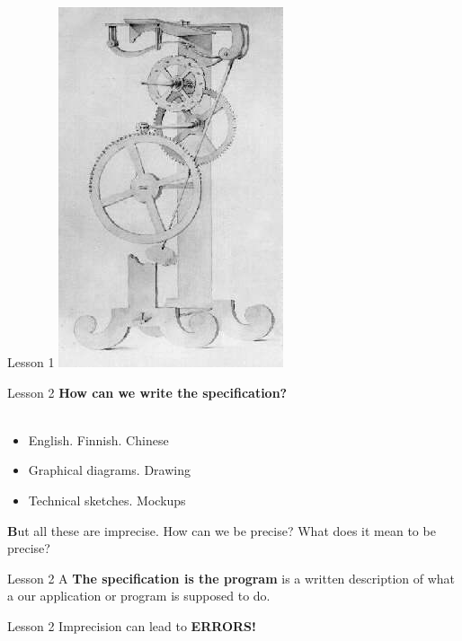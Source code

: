 \documentclass[aspectratio=1610]{beamer}
\begin{document}
\begin{frame}{Lesson 1}{}
\includegraphics[scale=0.35]{Images/Galileo_Pendulum_Clock}
\end{frame}



\begin{frame}{Lesson 2}{}
\LARGE
\textbf{How can we write the specification?}\\~\\
\begin{itemize}
    \item English. Finnish. Chinese
    \item Graphical diagrams. Drawing
    \item Technical sketches. Mockups
\end{itemize}

\Large
\textbf But all these are imprecise. How can we be precise? What does it mean to be precise?
\end{frame}



\begin{frame}{Lesson 2}{}
\Huge
    A \textbf{The specification is the program} is a
    \alert{written} description of what a our application or program
    is supposed to do.
\end{frame}












\begin{frame}{Lesson 2}{}
\Huge
	Imprecision can lead to \alert{\textbf{ERRORS!}}
\end{frame}
\end{document}
